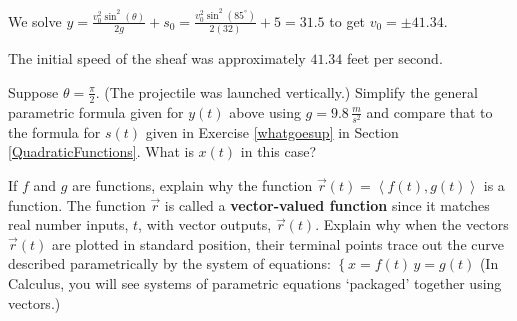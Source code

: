 \documentclass{ximera}
\begin{document}
\begin{question}
\begin{problem}
 \begin{solution}
We solve $y = \frac{v_{0}^2 \sin^{2}(\theta)}{2g} + s_{0}  = \frac{v_{0}^2 \sin^{2}(85^{\circ})}{2(32)} + 5 = 31.5$ to get $v_{0} = \pm 41.34$.  


The initial speed of the sheaf was approximately $41.34$ feet per second.
 \end{solution}
 \end{problem}

\begin{problem}
Suppose $\theta = \frac{\pi}{2}$. (The projectile was launched vertically.) Simplify the general parametric formula given for $y(t)$ above using  $g = 9.8 \, \frac{m}{s^2}$ and compare that to the formula for $s(t)$ given in Exercise \ref{whatgoesup} in Section \ref{QuadraticFunctions}.  What is $x(t)$ in this case?
\end{problem}

\end{question}

\begin{problem}
 If $f$ and $g$ are functions, explain why the function $\vec{r}(t) = \left<f(t), g(t) \right>$ is a function. The function $\vec{r}$ is called a \textbf{vector-valued function} since it matches real number inputs, $t$, with vector outputs, $\vec{r}(t)$.   Explain why when the vectors  $\vec{r}(t)$ are plotted in standard position, their terminal points trace out the curve described parametrically by the system of equations:  $\left\{ x = f(t) \, y =  g(t) \right.$  (In Calculus, you will see  systems of parametric equations `packaged' together using vectors.)
\end{problem}
\end{document}
